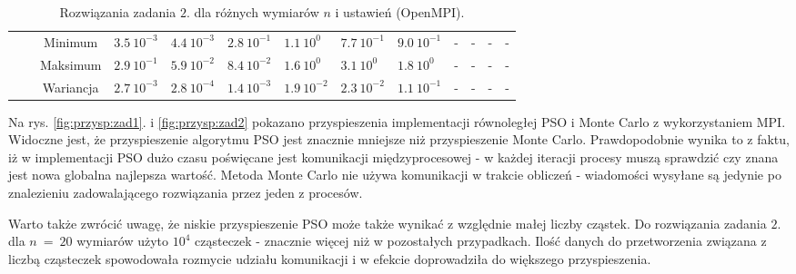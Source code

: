 \documentclass[11pt, a4paper, oneside]{article}
\begin{document}
\begin{table}[H]
\begin{adjustwidth}{-1.76cm}{}
\begin{tabular}{|c|c|c|l|l|l|l|l|l|c|c|c|c|}
                      &                               & Minimum   & $3.5 \ 10^{-3}$          & $4.4 \ 10^{-3}$         & $2.8 \ 10^{-1}$          & $1.1 \ 10^{0}$          & $7.7 \ 10^{-1}$          & $9.0 \ 10^{-1}$         & -           & -         & -           & -          \\ \cline{3-13} 
                      &                               & Maksimum  & $2.9 \ 10^{-1}$          & $5.9 \ 10^{-2}$         & $8.4 \ 10^{-2}$          & $1.6 \ 10^{0}$          & $3.1 \ 10^{0}$           & $1.8 \ 10^{0}$          & -           & -         & -           & -          \\ \cline{3-13} 
                      &                               & Wariancja & $2.7 \ 10^{-3}$          & $2.8 \ 10^{-4}$         & $1.4 \ 10^{-3}$          & $1.9 \ 10^{-2}$         & $2.3 \ 10^{-2}$          & $1.1 \ 10^{-1}$         & -           & -         & -           & -          \\ \hline
\end{tabular}
\end{adjustwidth}
\caption{Rozwiązania zadania $2$. dla różnych wymiarów $n$ i ustawień (OpenMPI).}
\label{tab:MPI:zad_2}
\end{table}

Na rys. \ref{fig:przysp:zad1}. i \ref{fig:przysp:zad2} pokazano przyspieszenia implementacji równoległej PSO i Monte Carlo z wykorzystaniem MPI. Widoczne jest, że przyspieszenie algorytmu PSO jest znacznie mniejsze niż przyspieszenie Monte Carlo. Prawdopodobnie wynika to z faktu, iż w implementacji PSO dużo czasu poświęcane jest komunikacji międzyprocesowej - w każdej iteracji procesy muszą sprawdzić czy znana jest nowa globalna najlepsza wartość. Metoda Monte Carlo nie używa komunikacji w trakcie obliczeń - wiadomości wysyłane są jedynie po znalezieniu zadowalającego rozwiązania przez jeden z procesów.

Warto także zwrócić uwagę, że niskie przyspieszenie PSO może także wynikać z względnie małej liczby cząstek. Do rozwiązania zadania $2$. dla $n \ = \ 20$ wymiarów użyto $10^{4}$ cząsteczek - znacznie więcej niż w pozostałych przypadkach. Ilość danych do przetworzenia związana z liczbą cząsteczek spowodowała rozmycie udziału komunikacji i w efekcie doprowadziła do większego przyspieszenia.
\end{document}
